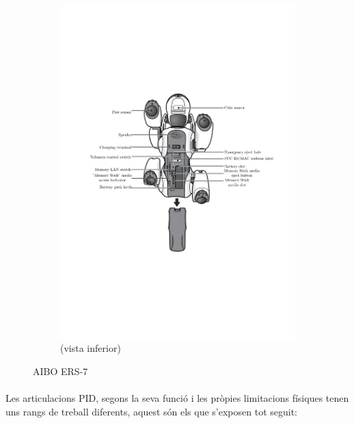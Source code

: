 \documentclass[12pt,a4paper,final,twoside]{article}
\begin{document}
\begin{figure}[H]
\begin{subfigure}[bl]{0.5\textwidth}
        			\includegraphics[width=\textwidth]{Imatges/ERS-7(stomach)}
                \caption{(vista inferior)}
        \end{subfigure}
        \caption{AIBO ERS-7 \cite{Aibo_Images}}
\end{figure}

\paragraph{}Les articulacions PID, segons la seva funció i les pròpies limitacions físiques tenen uns rangs de treball diferents, aquest són els que s'exposen tot seguit: 
\end{document}
